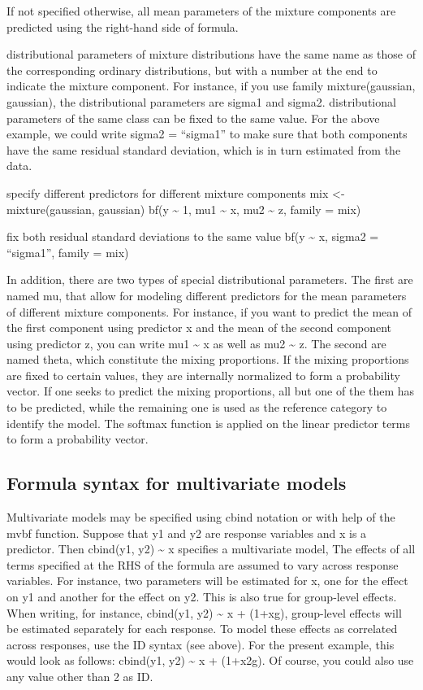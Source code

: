 \documentclass[]{book}
\begin{document}
If not specified otherwise, all mean parameters of the mixture components are predicted using the right-hand side of formula.

distributional parameters of mixture distributions have the same name as those of the corresponding ordinary distributions, but with a number at the end to indicate the mixture component. For instance, if you use family mixture(gaussian, gaussian), the distributional parameters are sigma1 and sigma2. distributional parameters of the same class can be fixed to the same value. For the above example, we could write sigma2 = ``sigma1'' to make sure that both components have the same residual standard deviation, which is in turn estimated from the data.

specify different predictors for different mixture components
mix \textless{}- mixture(gaussian, gaussian)
bf(y \textasciitilde{} 1, mu1 \textasciitilde{} x, mu2 \textasciitilde{} z, family = mix)

fix both residual standard deviations to the same value
bf(y \textasciitilde{} x, sigma2 = ``sigma1'', family = mix)

In addition, there are two types of special distributional parameters. The first are named mu, that allow for modeling different predictors for the mean parameters of different mixture components. For instance, if you want to predict the mean of the first component using predictor x and the mean of the second component using predictor z, you can write mu1 \textasciitilde{} x as well as mu2 \textasciitilde{} z. The second are named theta, which constitute the mixing proportions. If the mixing proportions are fixed to certain values, they are internally normalized to form a probability vector. If one seeks to predict the mixing proportions, all but one of the them has to be predicted, while the remaining one is used as the reference category to identify the model. The softmax function is applied on the linear predictor terms to form a probability vector.

\hypertarget{formula-syntax-for-multivariate-models}{%
\subsection{Formula syntax for multivariate models}\label{formula-syntax-for-multivariate-models}}

Multivariate models may be specified using cbind notation or with help of the mvbf function. Suppose that y1 and y2 are response variables and x is a predictor. Then cbind(y1, y2) \textasciitilde{} x specifies a multivariate model, The effects of all terms specified at the RHS of the formula are assumed to vary across response variables. For instance, two parameters will be estimated for x, one for the effect on y1 and another for the effect on y2. This is also true for group-level effects. When writing, for instance, cbind(y1, y2) \textasciitilde{} x + (1+x\textbar{}g), group-level effects will be estimated separately for each response. To model these effects as correlated across responses, use the ID syntax (see above). For the present example, this would look as follows: cbind(y1, y2) \textasciitilde{} x + (1+x\textbar{}2\textbar{}g). Of course, you could also use any value other than 2 as ID.
\end{document}
